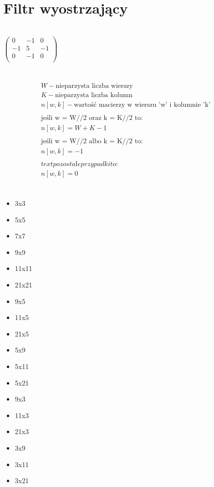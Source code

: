 \documentclass[a4paper,12pt,openany]{report}
\begin{document}
\section{Filtr wyostrzający}
\\
\linebreak
$\begin{pmatrix}
0 & -1 & 0 \\
-1 & 5 & -1 \\
0 & -1 & 0 \\
\end{pmatrix}$
\\
\linebreak
{}
\\
\linebreak
{}
\\
\linebreak
\begin{gather*}
W - \text{nieparzysta liczba wierszy} \\
K - \text{nieparzysta liczba kolumn} \\
n[w, k] - \text{wartość macierzy w wierszu 'w' i kolumnie 'k'} \\
\\
\text{jeśli w = W//2 oraz k = K//2 to:}\\
n[w, k] = W + K - 1\\
\\
\text{jeśli w = W//2 albo k = K//2 to:}\\
n[w, k] = -1\\
\\
text{pozostałe przypadki to:}\\
n[w, k] = 0\\
\end{gather*}
\\
\linebreak
{}
\begin{itemize}
\item 3x3
\item 5x5
\item 7x7
\item 9x9
\item 11x11
\item 21x21
\item 9x5
\item 11x5
\item 21x5
\item 5x9
\item 5x11
\item 5x21
\item 9x3
\item 11x3
\item 21x3
\item 3x9
\item 3x11
\item 3x21
\end{itemize}
\pagebreak
\end{document}
